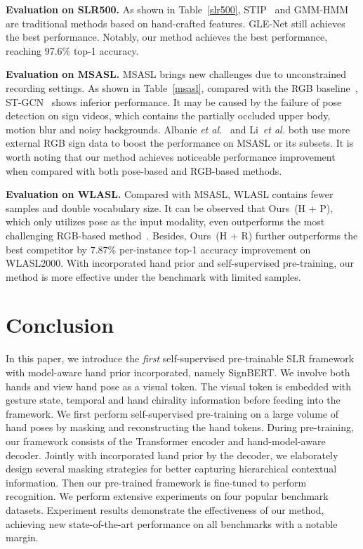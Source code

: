 \documentclass[10pt,twocolumn,letterpaper]{article}
\begin{document}
\noindent \textbf{Evaluation on SLR500.}
As shown in Table~\ref{slr500}, STIP~\cite{laptev2005space} and GMM-HMM~\cite{tang2015real} are traditional methods based on hand-crafted features. 
GLE-Net \cite{hu2020global} still achieves the best performance. 
Notably, our method achieves the best performance, reaching $97.6\%$ top-1 accuracy.



\noindent \textbf{Evaluation on MSASL.}
MSASL brings new challenges due to unconstrained recording settings.
As shown in Table~\ref{msasl}, compared with the RGB baseline~\cite{joze2018ms}, ST-GCN~\cite{yan2018spatial} shows inferior performance. 
It may be caused by the failure of pose detection on sign videos, which contains the partially occluded upper body, motion blur and noisy backgrounds. 
Albanie \emph{et al.}~\cite{albanie2020bsl} and Li~\emph{et al.} \cite{li2020transfer} both use more external RGB sign data to boost the performance on MSASL or its subsets. 
It is worth noting that our method achieves noticeable performance improvement when compared with both pose-based and RGB-based methods.


\noindent \textbf{Evaluation on WLASL.}
Compared with MSASL, WLASL contains fewer samples and double vocabulary size. 
It can be observed that Ours~(H + P), which only utilizes pose as the input modality, even outperforms the most challenging RGB-based method~\cite{albanie2020bsl}.
Besides, Ours~(H + R) further outperforms the best competitor by $7.87\%$ per-instance top-1 accuracy improvement on WLASL2000.
With incorporated hand prior and self-supervised pre-training, our method is more effective under the benchmark with limited samples.



\section{Conclusion}
In this paper, we introduce the \emph{first} self-supervised pre-trainable SLR framework with model-aware hand prior incorporated, namely SignBERT.
We involve both hands and view hand pose as a visual token.
The visual token is embedded with gesture state, temporal and hand chirality information before feeding into the framework.
We first perform self-supervised pre-training on a large volume of hand poses by masking and reconstructing the hand tokens.
During pre-training, our framework consists of the Transformer encoder and hand-model-aware decoder.
Jointly with incorporated hand prior by the decoder, we elaborately design several masking strategies for better capturing hierarchical contextual information.
Then our pre-trained framework is fine-tuned to perform recognition.
We perform extensive experiments on four popular benchmark datasets.
Experiment results demonstrate the effectiveness of our method, achieving new state-of-the-art performance on all benchmarks with a notable margin.
\end{document}
